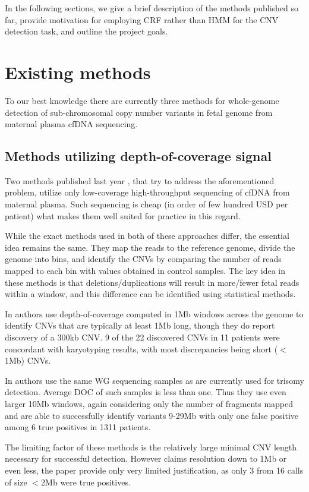 \documentclass[11pt]{article}
\begin{document}
In the following sections, we give a brief description of the methods published so far, provide motivation for employing CRF rather than HMM for the CNV detection task, and outline the project goals.

\section{Existing methods}
To our best knowledge there are currently three methods for whole-genome detection of sub-chromosomal copy number variants in fetal genome from maternal plasma cfDNA sequencing.

\subsection{Methods utilizing depth-of-coverage signal}
Two methods published last year \citep{chen2013, srinivasan2013}, that try to address the aforementioned problem, utilize only low-coverage high-throughput sequencing of cfDNA from maternal plasma. Such sequencing is cheap (in order of few hundred USD per patient) what makes them well suited for practice in this regard.

While the exact methods used in both of these approaches differ, the essential idea remains the same. They map the reads to the reference genome, divide the genome into bins, and identify the CNVs by comparing the number of reads mapped to each bin with values obtained in control samples. The key idea in these methods is that deletions/duplications will result in more/fewer fetal reads within a window, and this difference can be identified using statistical methods.

In \cite{srinivasan2013} authors use depth-of-coverage computed in 1Mb windows across the genome to identify CNVs that are typically at least 1Mb long, though they do report discovery of a 300kb CNV. 9 of the 22 discovered CNVs in 11 patients were concordant with karyotyping results, with most discrepancies being short ($<$1Mb) CNVs.

In \cite{chen2013} authors use the same WG sequencing samples as are currently used for trisomy detection. Average DOC of such samples is less than one. Thus they use even larger 10Mb windows, again considering only the number of fragments mapped and are able to successfully identify variants 9-29Mb with only one false positive among 6 true positives in 1311 patients.

The limiting factor of these methods is the relatively large minimal CNV length  necessary for successful detection. However \cite{srinivasan2013} claims resolution down to 1Mb or even less, the paper provide only very limited justification, as only 3 from 16 calls of size $<$2Mb were true positives.
\end{document}
